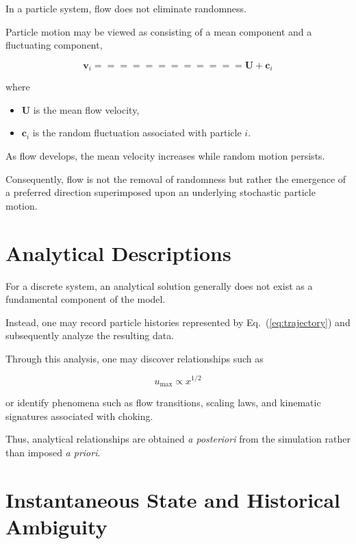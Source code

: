 In a particle system, flow does not eliminate randomness.

Particle motion may be viewed as consisting of a mean component and a fluctuating component,

\begin{equation}
\mathbf{v}_i
============
\mathbf{U}
+
\mathbf{c}_i
\label{eq:velocity_decomposition}
\end{equation}

where

\begin{itemize}
\item $\mathbf{U}$ is the mean flow velocity,
\item $\mathbf{c}_i$ is the random fluctuation associated with particle $i$.
\end{itemize}

As flow develops, the mean velocity increases while random motion persists.

Consequently, flow is not the removal of randomness but rather the emergence of a preferred direction superimposed upon an underlying stochastic particle motion.

\section{Analytical Descriptions}

For a discrete system, an analytical solution generally does not exist as a fundamental component of the model.

Instead, one may record particle histories represented by Eq.~(\ref{eq:trajectory}) and subsequently analyze the resulting data.

Through this analysis, one may discover relationships such as

\begin{equation}
u_{\max}
\propto
x^{1/2}
\label{eq:scaling}
\end{equation}

or identify phenomena such as flow transitions, scaling laws, and kinematic signatures associated with choking.

Thus, analytical relationships are obtained \emph{a posteriori} from the simulation rather than imposed \emph{a priori}.

\section{Instantaneous State and Historical Ambiguity}

